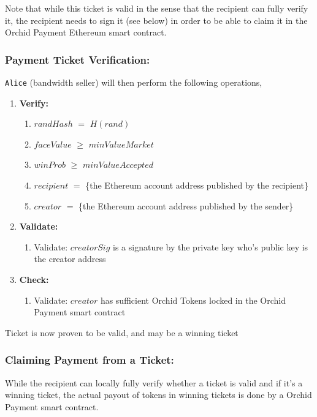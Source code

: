 Note that while this ticket is valid in the sense that the recipient can fully verify it, the recipient needs to sign it (see below) in order to be able to claim it in the Orchid Payment Ethereum smart contract.

\subsubsection{Payment Ticket Verification:}
\texttt{Alice} (bandwidth seller) will then perform the following operations,
\begin{enumerate}
  \item[] \textbf{Verify:} \begin{enumerate}
  	\item $randHash$ $=$ $H(rand)$
    \item $faceValue$ $\geq$ $minValueMarket$%
    \item $winProb$ $\geq$ $minValueAccepted$%
    \item $recipient$ $=$ \{the Ethereum account address published by the recipient\}
    \item $creator$ $=$ \{the Ethereum account address published by the sender\}
  \end{enumerate}
  \item[] \textbf{Validate:} \begin{enumerate}
  	\item Validate: $creatorSig$ is a signature by the private key who's public key is the creator address
  \end{enumerate}
  \item[] \textbf{Check:} \begin{enumerate}
  	\item Validate: $creator$ has sufficient Orchid Tokens locked in the Orchid Payment smart contract
  \end{enumerate}
\end{enumerate}
Ticket is now proven to be valid, and may be a winning ticket\\

\subsubsection{Claiming Payment from a Ticket:}

While the recipient can locally fully verify whether a ticket is valid and if it's a winning ticket, the actual payout of tokens in winning tickets is done by a Orchid Payment smart contract.\\

